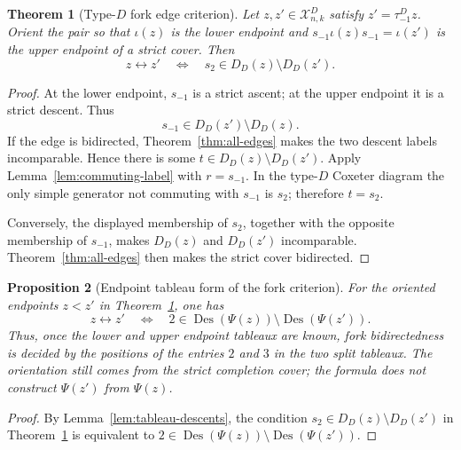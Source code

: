 \documentclass[11pt]{article}
\newtheorem{theorem}{Theorem}[section]
\newtheorem{proposition}[theorem]{Proposition}
\theoremstyle{definition}
\theoremstyle{remark}
\newcommand{\Des}{\operatorname{Des}}
\newcommand{\cX}{\mathcal X}
\begin{document}
\begin{theorem}[Type-$D$ fork edge criterion]
\label{thm:D-fork}
Let $z,z'\in\cX^D_{n,k}$ satisfy $z'=\tau^D_{-1}z$.  Orient the pair
so that $\iota(z)$ is the lower endpoint and
$s_{-1}\iota(z)s_{-1}=\iota(z')$ is the upper endpoint of a strict cover.
Then
\begin{equation}
 z\longleftrightarrow z'
 \quad\Longleftrightarrow\quad
 s_2\in D_D(z)\setminus D_D(z').
 \label{eq:D-fork-criterion}
\end{equation}
\end{theorem}

\begin{proof}
At the lower endpoint, $s_{-1}$ is a strict ascent; at the upper endpoint
it is a strict descent.  Thus
\[
 s_{-1}\in D_D(z')\setminus D_D(z).
\]
If the edge is bidirected, Theorem~\ref{thm:all-edges} makes the two
descent labels incomparable.  Hence there is some
$t\in D_D(z)\setminus D_D(z')$.  Apply
Lemma~\ref{lem:commuting-label} with $r=s_{-1}$.  In the type-$D$ Coxeter
diagram the only simple generator not commuting with $s_{-1}$ is $s_2$;
therefore $t=s_2$.

Conversely, the displayed membership of $s_2$, together with the opposite
membership of $s_{-1}$, makes $D_D(z)$ and $D_D(z')$ incomparable.
Theorem~\ref{thm:all-edges} then makes the strict cover bidirected.
\end{proof}

\begin{proposition}[Endpoint tableau form of the fork criterion]
\label{prop:D-tableau-fork-criterion}
For the oriented endpoints $z<z'$ in Theorem~\ref{thm:D-fork}, one has
\begin{equation}
 z\longleftrightarrow z'
 \quad\Longleftrightarrow\quad
 2\in\Des(\Psi(z))\setminus\Des(\Psi(z')).
 \label{eq:D-tableau-fork-criterion}
\end{equation}
Thus, once the lower and upper endpoint tableaux are known, fork
bidirectedness is decided by the positions of the entries $2$ and $3$ in
the two split tableaux.  The orientation still comes from the strict
completion cover; the formula does not construct $\Psi(z')$ from
$\Psi(z)$.
\end{proposition}

\begin{proof}
By Lemma~\ref{lem:tableau-descents}, the condition
$s_2\in D_D(z)\setminus D_D(z')$ in Theorem~\ref{thm:D-fork} is
equivalent to
$2\in\Des(\Psi(z))\setminus\Des(\Psi(z'))$.
\end{proof}
\end{document}

